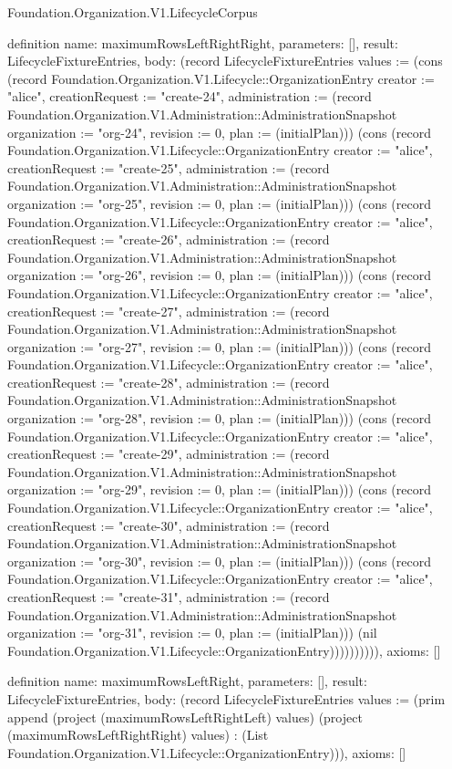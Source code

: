 \begin{lexlean}{Foundation.Organization.V1.LifecycleCorpus}
\begin{semanticmodule}
definition{
  name: maximumRowsLeftRightRight,
  parameters: [],
  result: LifecycleFixtureEntries,
  body: (record LifecycleFixtureEntries {values := (cons (record Foundation.Organization.V1.Lifecycle::OrganizationEntry {creator := "alice", creationRequest := "create-24", administration := (record Foundation.Organization.V1.Administration::AdministrationSnapshot {organization := "org-24", revision := 0, plan := (initialPlan)})}) (cons (record Foundation.Organization.V1.Lifecycle::OrganizationEntry {creator := "alice", creationRequest := "create-25", administration := (record Foundation.Organization.V1.Administration::AdministrationSnapshot {organization := "org-25", revision := 0, plan := (initialPlan)})}) (cons (record Foundation.Organization.V1.Lifecycle::OrganizationEntry {creator := "alice", creationRequest := "create-26", administration := (record Foundation.Organization.V1.Administration::AdministrationSnapshot {organization := "org-26", revision := 0, plan := (initialPlan)})}) (cons (record Foundation.Organization.V1.Lifecycle::OrganizationEntry {creator := "alice", creationRequest := "create-27", administration := (record Foundation.Organization.V1.Administration::AdministrationSnapshot {organization := "org-27", revision := 0, plan := (initialPlan)})}) (cons (record Foundation.Organization.V1.Lifecycle::OrganizationEntry {creator := "alice", creationRequest := "create-28", administration := (record Foundation.Organization.V1.Administration::AdministrationSnapshot {organization := "org-28", revision := 0, plan := (initialPlan)})}) (cons (record Foundation.Organization.V1.Lifecycle::OrganizationEntry {creator := "alice", creationRequest := "create-29", administration := (record Foundation.Organization.V1.Administration::AdministrationSnapshot {organization := "org-29", revision := 0, plan := (initialPlan)})}) (cons (record Foundation.Organization.V1.Lifecycle::OrganizationEntry {creator := "alice", creationRequest := "create-30", administration := (record Foundation.Organization.V1.Administration::AdministrationSnapshot {organization := "org-30", revision := 0, plan := (initialPlan)})}) (cons (record Foundation.Organization.V1.Lifecycle::OrganizationEntry {creator := "alice", creationRequest := "create-31", administration := (record Foundation.Organization.V1.Administration::AdministrationSnapshot {organization := "org-31", revision := 0, plan := (initialPlan)})}) (nil Foundation.Organization.V1.Lifecycle::OrganizationEntry)))))))))}),
  axioms: []
}

definition{
  name: maximumRowsLeftRight,
  parameters: [],
  result: LifecycleFixtureEntries,
  body: (record LifecycleFixtureEntries {values := (prim append (project (maximumRowsLeftRightLeft) values) (project (maximumRowsLeftRightRight) values) : (List Foundation.Organization.V1.Lifecycle::OrganizationEntry))}),
  axioms: []
}


\end{semanticmodule}
\end{lexlean}
